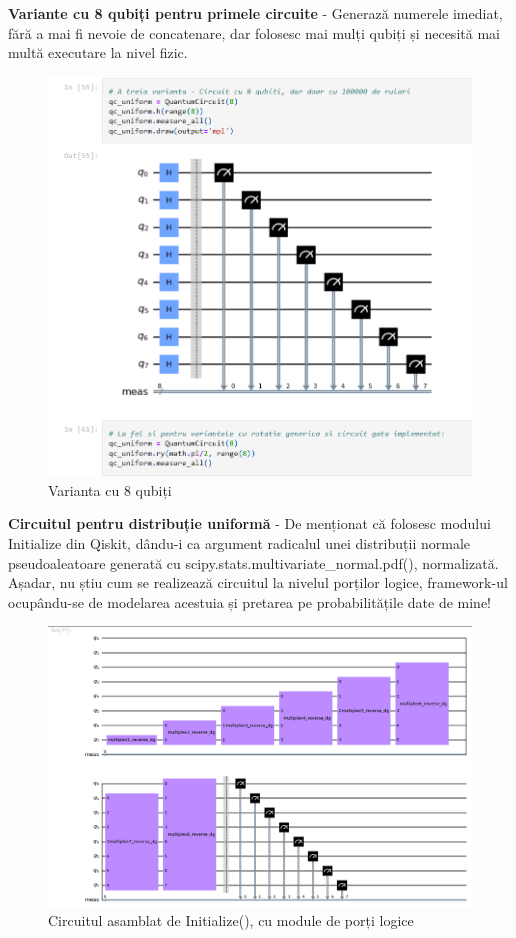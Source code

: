 \documentclass[12pt]{report}
\begin{document}
\textbf{Variante cu 8 qubiți pentru primele circuite} - Generază numerele imediat, fără a mai fi nevoie de concatenare, dar folosesc mai mulți qubiți și necesită mai multă executare la nivel fizic.

\begin{figure}[H]
    \centering
    \includegraphics[scale=0.80]{anexe/figuri/Variante8Qubiti.png}
    \caption{Varianta cu 8 qubiți}
    \label{fig:Varianta8Qubiti}
\end{figure}

\textbf{Circuitul pentru distribuție uniformă} - De menționat că folosesc modului Initialize din Qiskit, dându-i ca argument radicalul unei distribuții normale pseudoaleatoare generată cu scipy.stats.multivariate\_normal.pdf(), normalizată. Așadar, nu știu cum se realizează circuitul la nivelul porților logice, framework-ul ocupându-se de modelarea acestuia și pretarea pe probabilitățile date de mine!

\begin{figure}[H]
    \centering
    \includegraphics[scale=0.6]{anexe/figuri/CircuitNormalEu.png}
    \caption{Circuitul asamblat de Initialize(), cu module de porți logice}
    \label{fig:CircuitNormalEu}
\end{figure}
\pagebreak
\end{document}
